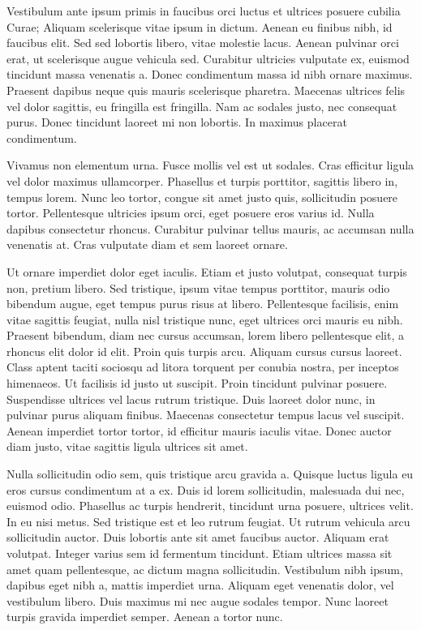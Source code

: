 \documentclass[letterpaper,10pt,english]{sphinxmanual}
\begin{document}
Vestibulum ante ipsum primis in faucibus orci luctus et ultrices posuere cubilia Curae; Aliquam scelerisque vitae ipsum in dictum. Aenean eu finibus nibh, id faucibus elit. Sed sed lobortis libero, vitae molestie lacus. Aenean pulvinar orci erat, ut scelerisque augue vehicula sed. Curabitur ultricies vulputate ex, euismod tincidunt massa venenatis a. Donec condimentum massa id nibh ornare maximus. Praesent dapibus neque quis mauris scelerisque pharetra. Maecenas ultrices felis vel dolor sagittis, eu fringilla est fringilla. Nam ac sodales justo, nec consequat purus. Donec tincidunt laoreet mi non lobortis. In maximus placerat condimentum.

Vivamus non elementum urna. Fusce mollis vel est ut sodales. Cras efficitur ligula vel dolor maximus ullamcorper. Phasellus et turpis porttitor, sagittis libero in, tempus lorem. Nunc leo tortor, congue sit amet justo quis, sollicitudin posuere tortor. Pellentesque ultricies ipsum orci, eget posuere eros varius id. Nulla dapibus consectetur rhoncus. Curabitur pulvinar tellus mauris, ac accumsan nulla venenatis at. Cras vulputate diam et sem laoreet ornare.

Ut ornare imperdiet dolor eget iaculis. Etiam et justo volutpat, consequat turpis non, pretium libero. Sed tristique, ipsum vitae tempus porttitor, mauris odio bibendum augue, eget tempus purus risus at libero. Pellentesque facilisis, enim vitae sagittis feugiat, nulla nisl tristique nunc, eget ultrices orci mauris eu nibh. Praesent bibendum, diam nec cursus accumsan, lorem libero pellentesque elit, a rhoncus elit dolor id elit. Proin quis turpis arcu. Aliquam cursus cursus laoreet. Class aptent taciti sociosqu ad litora torquent per conubia nostra, per inceptos himenaeos. Ut facilisis id justo ut suscipit. Proin tincidunt pulvinar posuere. Suspendisse ultrices vel lacus rutrum tristique. Duis laoreet dolor nunc, in pulvinar purus aliquam finibus. Maecenas consectetur tempus lacus vel suscipit. Aenean imperdiet tortor tortor, id efficitur mauris iaculis vitae. Donec auctor diam justo, vitae sagittis ligula ultrices sit amet.

Nulla sollicitudin odio sem, quis tristique arcu gravida a. Quisque luctus ligula eu eros cursus condimentum at a ex. Duis id lorem sollicitudin, malesuada dui nec, euismod odio. Phasellus ac turpis hendrerit, tincidunt urna posuere, ultrices velit. In eu nisi metus. Sed tristique est et leo rutrum feugiat. Ut rutrum vehicula arcu sollicitudin auctor. Duis lobortis ante sit amet faucibus auctor. Aliquam erat volutpat. Integer varius sem id fermentum tincidunt. Etiam ultrices massa sit amet quam pellentesque, ac dictum magna sollicitudin. Vestibulum nibh ipsum, dapibus eget nibh a, mattis imperdiet urna. Aliquam eget venenatis dolor, vel vestibulum libero. Duis maximus mi nec augue sodales tempor. Nunc laoreet turpis gravida imperdiet semper. Aenean a tortor nunc.
\end{document}
